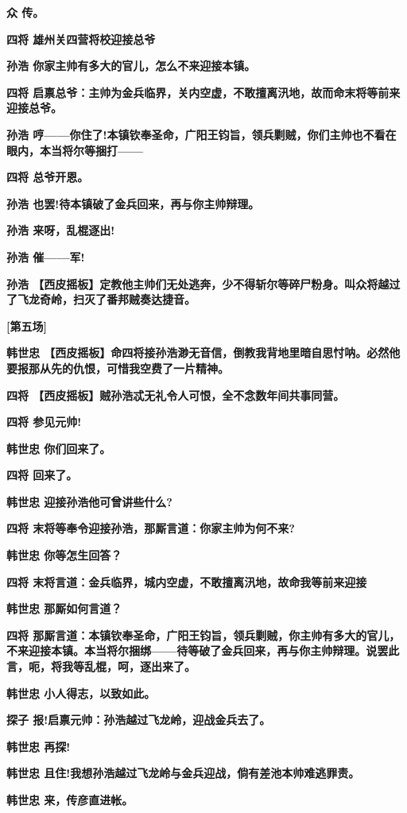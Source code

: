 \textbf{众 传。}

\textbf{四将 雄州关四营将校迎接总爷}

\textbf{孙浩 你家主帅有多大的官儿，怎么不来迎接本镇。}

\textbf{四将
启禀总爷：主帅为金兵临界，关内空虚，不敢擅离汛地，故而命末将等前来迎接总爷。}

\textbf{孙浩
哼------你住了!本镇钦奉圣命，广阳王钧旨，领兵剿贼，你们主帅也不看在眼内，本当将尔等捆打------}

\textbf{四将 总爷开恩。}

\textbf{孙浩 也罢!待本镇破了金兵回来，再与你主帅辩理。}

\textbf{孙浩 来呀，乱棍逐出!}

\textbf{孙浩 催------军!}

\textbf{孙浩
【西皮摇板】定教他主帅们无处逃奔，少不得斩尔等碎尸粉身。叫众将越过了飞龙奇岭，扫灭了番邦贼奏达捷音。}

\textbf{{[}第五场{]}}

\textbf{韩世忠
【西皮摇板】命四将接孙浩渺无音信，倒教我背地里暗自思忖呐。必然他要报那从先的仇恨，可惜我空费了一片精神。}

\textbf{四将 【西皮摇板】贼孙浩忒无礼令人可恨，全不念数年间共事同营。}

\textbf{四将 参见元帅!}

\textbf{韩世忠 你们回来了。}

\textbf{四将 回来了。}

\textbf{韩世忠 迎接孙浩他可曾讲些什么?}

\textbf{四将 末将等奉令迎接孙浩，那厮言道：你家主帅为何不来?}

\textbf{韩世忠 你等怎生回答？}

\textbf{四将
末将言道：金兵临界，城内空虚，不敢擅离汛地，故命我等前来迎接}

\textbf{韩世忠 那厮如何言道？}

\textbf{四将
那厮言道：本镇钦奉圣命，广阳王钧旨，领兵剿贼，你主帅有多大的官儿，不来迎接本镇。本当将尔捆绑------待等破了金兵回来，再与你主帅辩理。说罢此言，呃，将我等乱棍，呵，逐出来了。}

\textbf{韩世忠 小人得志，以致如此。}

\textbf{探子 报!启禀元帅：孙浩越过飞龙岭，迎战金兵去了。}

\textbf{韩世忠 再探!}

\textbf{韩世忠
且住!我想孙浩越过飞龙岭与金兵迎战，倘有差池本帅难逃罪责。}

\textbf{韩世忠 来，传彦直进帐。}

